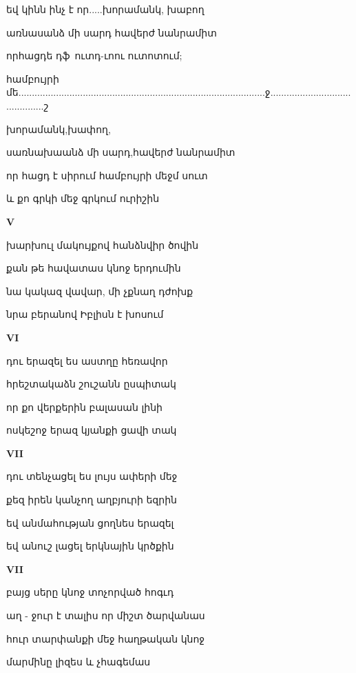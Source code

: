 եվ կինն ինչ է որ.....խորամանկ, խաբող



առնասանձ  մի սարդ հավերժ նանրամիտ


որհացդե դֆ\ ուտդ-ւոու ուտոտում;


համբույրի
մե............................................................................................ջ............................................շ





խորամանկ,խափող, 




սառնախաանձ մի սարդ,հավերժ  նանրամիտ




որ հացդ է սիրում համբույրի մեջմ  սուտ 





և քո գրկի մեջ գրկում ուրիշին 



\centerline  {\bf V}

խարխուլ մակույքով հանձնվիր ծովին


քան թե հավատաս կնոջ երդումին

նա կակազ վավար, մի չքնաղ դժոխք 


նրա բերանով Իբլիսն է խոսում

\centerline{\bf   VI}


դու երազել ես աստղը հեռավոր


հրեշտակաձն շուշանն ըսպիտակ

որ քո վերքերին բալասան լինի 


ոսկեշոջ  երազ կյանքի ցավի տակ


 \centerline  {\bf VII}

 դու տենչացել ես լույս ափերի մեջ


 քեզ իրեն կանչող աղբյուրի եզրին


 եվ անմահության ցողնես երազել


 եվ անուշ լացել երկնային կրծքին



\centerline {\bf VII}

բայց սերը կնոջ տոչորված հոգւդ



աղ - ջուր է տալիս  որ միշտ ծարվանաս


հուր տարփանքի  մեջ հաղթական կնոջ



մարմինը   լիզես   և չհագեմաս





